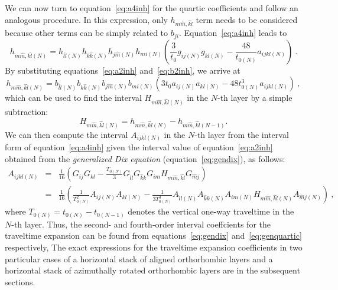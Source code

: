 We can now turn to equation~\ref{eq:a4inh} for the quartic coefficients and follow an analogous procedure. In this expression, only $h_{m \hat{m},\hat{k}\hat{l}}$ term needs to be considered because other terms can be simply related to $b_{ji}$. Equation~\ref{eq:a4inh} leads to
\begin{equation}
h_{m \hat{m},\hat{k}\hat{l}(N)} = h_{l\hat{l}(N)}h_{k\hat{k}(N)}h_{j \hat{m}(N)}h_{m i(N)}\left(\frac{3}{t_0} g_{ij(N)}g_{kl(N)}-\frac{48}{ t_{0(N)}}a_{ijkl(N)}\right)~.
\end{equation}
By substituting equations~\ref{eq:a2inh} and~\ref{eq:b2inh}, we arrive at
\begin{equation}
h_{m \hat{m},\hat{k}\hat{l}(N)} = b_{l\hat{l}(N)}b_{k\hat{k}(N)}b_{j \hat{m}(N)}b_{m i(N)}\left(3t_0 a_{ij(N)}a_{kl(N)}-48 t^3_{0(N)}a_{ijkl(N)}\right)~,
\end{equation}
which can be used to find the interval $H_{m \hat{m},\hat{k}\hat{l}(N)}$ in the $N$-th layer by a simple subtraction:
\begin{equation}
H_{m \hat{m},\hat{k}\hat{l}(N)} = h_{m \hat{m},\hat{k}\hat{l}(N)} - h_{m \hat{m},\hat{k}\hat{l}(N-1)}.
\end{equation}
We can then compute the interval  $A_{ijkl(N)}$ in the $N$-th layer from the interval form of equation~\ref{eq:a4inh} given the interval value of equation~\ref{eq:a2inh} obtained from the \textit{generalized Dix equation} (equation~\ref{eq:gendix}), as follows:
\begin{eqnarray}
\nonumber
A_{ijkl(N)} & = & \frac{1}{16} \left( G_{ij} G_{kl} - \frac{T_{0(N)}}{3}G_{\hat{l}l}G_{\hat{k}k}G_{im}H_{m \hat{m},\hat{k}\hat{l}}G_{\hat{m}j} \right) \\
\label{eq:genquartic}
& = & \frac{1}{16} \left( \frac{1}{T^2_{0(N)}} A_{ij(N)} A_{kl(N)} - \frac{1}{3T^3_{0(N)}}A_{\hat{l}l(N)}A_{\hat{k}k(N)}A_{i m(N)}H_{m \hat{m},\hat{k}\hat{l}(N)}A_{\hat{m}j(N)} \right)~,
\end{eqnarray}
where $T_{0(N)} = t_{0(N)}-t_{0(N-1)}$ denotes the vertical one-way traveltime in the $N$-th layer. Thus, the second- and fourth-order interval coeffcients for the traveltime expansion can be found from equations~\ref{eq:gendix} and~\ref{eq:genquartic} respectively, The exact expressions for the traveltime expansion coefficients in two particular cases of a horizontal stack of aligned orthorhombic layers and a horizontal stack of azimuthally rotated orthorhombic layers are  in the subsequent sections. 

